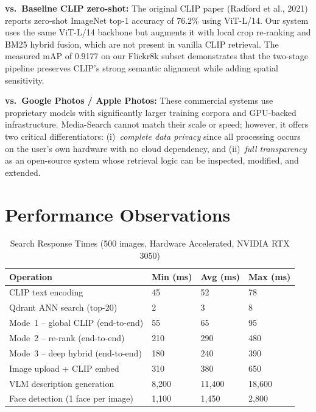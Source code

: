 \documentclass[12pt,a4paper,oneside]{report}
\begin{document}
\noindent\textbf{vs.\ Baseline CLIP zero-shot:} The original CLIP paper
(Radford et al., 2021) reports zero-shot ImageNet top-1 accuracy of 76.2\%
using ViT-L/14. Our system uses the same ViT-L/14 backbone but augments it
with local crop re-ranking and BM25 hybrid fusion, which are not present in
vanilla CLIP retrieval. The measured mAP of 0.9177 on our Flickr8k subset
demonstrates that the two-stage pipeline preserves CLIP's strong semantic
alignment while adding spatial sensitivity.

\noindent\textbf{vs.\ Google Photos / Apple Photos:} These commercial systems
use proprietary models with significantly larger training corpora and
GPU-backed infrastructure. Media-Search cannot match their scale or speed;
however, it offers two critical differentiators: (i)~\emph{complete data
privacy} since all processing occurs on the user's own hardware with no
cloud dependency, and (ii)~\emph{full transparency} as an open-source system
whose retrieval logic can be inspected, modified, and extended.
\section{Performance Observations}

\begin{table}[H]
\centering\small
\caption{Search Response Times (500 images, Hardware Accelerated, NVIDIA RTX 3050)}
\label{tab:perf}
\renewcommand{\arraystretch}{1.4}
\begin{tabular}{|p{5.5cm}|p{2.2cm}|p{2.2cm}|p{2.2cm}|}
\hline
\textbf{Operation} & \textbf{Min (ms)} & \textbf{Avg (ms)} & \textbf{Max (ms)} \\
\hline
CLIP text encoding & 45 & 52 & 78 \\
\hline
Qdrant ANN search (top-20) & 2 & 3 & 8 \\
\hline
Mode~1 -- global CLIP (end-to-end) & 55 & 65 & 95 \\
\hline
Mode~2 -- re-rank (end-to-end) & 210 & 290 & 480 \\
\hline
Mode~3 -- deep hybrid (end-to-end) & 180 & 240 & 390 \\
\hline
Image upload + CLIP embed & 310 & 380 & 650 \\
\hline
VLM description generation & 8{,}200 & 11{,}400 & 18{,}600 \\
\hline
Face detection (1 face per image) & 1{,}100 & 1{,}450 & 2{,}800 \\
\hline
\end{tabular}
\end{table}
\end{document}
